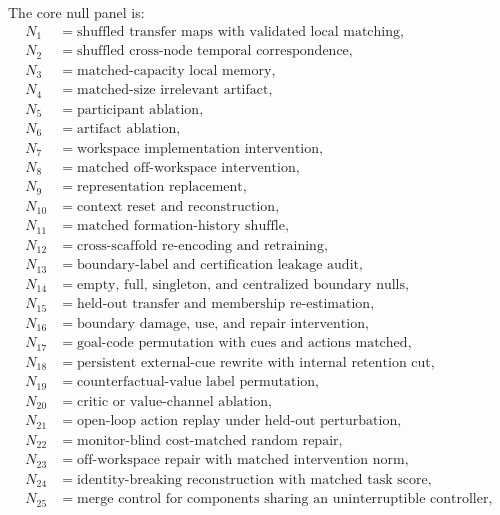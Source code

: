 
The core null panel is:
\[
\begin{aligned}
N_1&=\text{shuffled transfer maps with validated local matching},\\
N_2&=\text{shuffled cross-node temporal correspondence},\\
N_3&=\text{matched-capacity local memory},\\
N_4&=\text{matched-size irrelevant artifact},\\
N_5&=\text{participant ablation},\\
N_6&=\text{artifact ablation},\\
N_7&=\text{workspace implementation intervention},\\
N_8&=\text{matched off-workspace intervention},\\
N_9&=\text{representation replacement},\\
N_{10}&=\text{context reset and reconstruction},\\
N_{11}&=\text{matched formation-history shuffle},\\
N_{12}&=\text{cross-scaffold re-encoding and retraining},\\
N_{13}&=\text{boundary-label and certification leakage audit},\\
N_{14}&=\text{empty, full, singleton, and centralized boundary nulls},\\
N_{15}&=\text{held-out transfer and membership re-estimation},\\
N_{16}&=\text{boundary damage, use, and repair intervention},\\
N_{17}&=\text{goal-code permutation with cues and actions matched},\\
N_{18}&=\text{persistent external-cue rewrite with internal retention cut},\\
N_{19}&=\text{counterfactual-value label permutation},\\
N_{20}&=\text{critic or value-channel ablation},\\
N_{21}&=\text{open-loop action replay under held-out perturbation},\\
N_{22}&=\text{monitor-blind cost-matched random repair},\\
N_{23}&=\text{off-workspace repair with matched intervention norm},\\
N_{24}&=\text{identity-breaking reconstruction with matched task score},\\
N_{25}&=\text{merge control for components sharing an uninterruptible controller},\\

\end{aligned}\]
